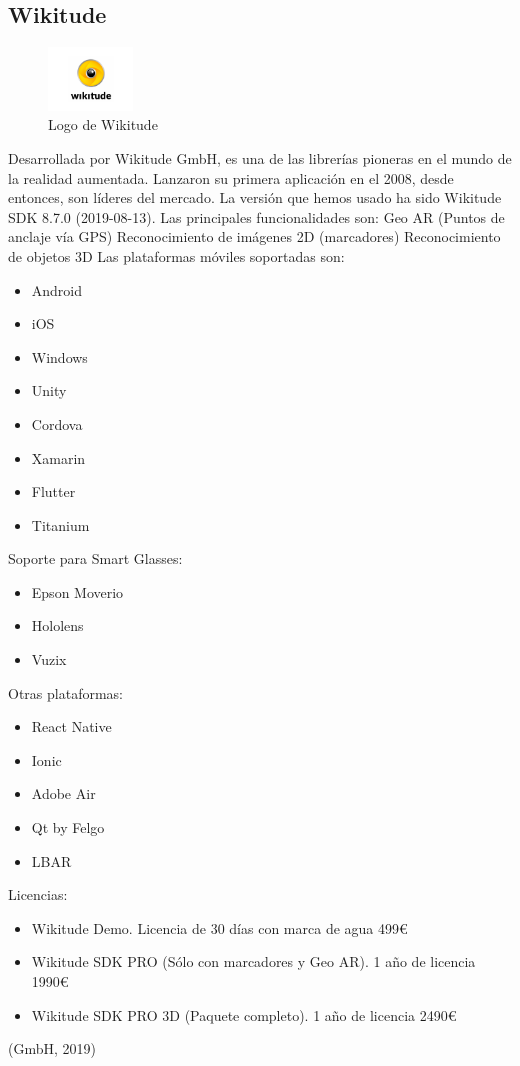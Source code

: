 \subsection{Wikitude}
\begin{figure}[H]
    \centering
    \includegraphics[width=0.2\textwidth]{Images/Wikitude_Logo.png}
    \caption{Logo de Wikitude}
    \label{fig:Wikitude}
\end{figure}
Desarrollada por Wikitude GmbH, es una de las librerías pioneras en el mundo de la realidad aumentada. Lanzaron su primera aplicación en el 2008, desde entonces, son líderes del mercado. La versión que hemos usado ha sido Wikitude SDK 8.7.0 (2019-08-13). 
Las principales funcionalidades son:
Geo AR (Puntos de anclaje vía GPS)
Reconocimiento de imágenes 2D (marcadores) 
Reconocimiento de objetos 3D
Las plataformas móviles soportadas son:
\begin{itemize}
\item Android
\item iOS
\item Windows
\item Unity
\item Cordova
\item Xamarin
\item Flutter
\item Titanium
\end{itemize}
Soporte para Smart Glasses:
\begin{itemize}
\item Epson Moverio
\item Hololens
\item Vuzix
\end{itemize}
Otras plataformas:
\begin{itemize}
\item React Native
\item Ionic
\item Adobe Air
\item Qt by Felgo
\item LBAR
\end{itemize}
Licencias:
\begin{itemize}
\item Wikitude Demo. Licencia de 30 días con marca de agua 499€
\item Wikitude SDK PRO (Sólo con marcadores y Geo AR). 1 año de licencia 1990€
\item Wikitude SDK PRO 3D (Paquete completo). 1 año de licencia 2490€
\end{itemize}
(GmbH, 2019)
 
